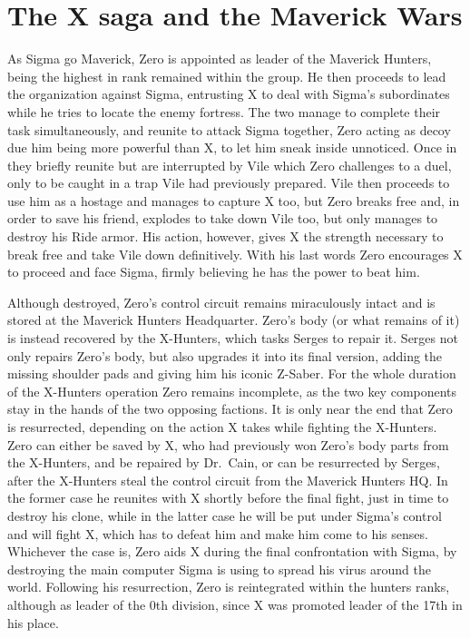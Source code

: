 \section{The X saga and the Maverick Wars}
As Sigma go Maverick, Zero is appointed as leader of the Maverick Hunters, being the highest in rank remained within the group. He then proceeds to lead the organization against Sigma, entrusting X to deal with Sigma's subordinates while he tries to locate the enemy fortress. The two manage to complete their task simultaneously, and reunite to attack Sigma together, Zero acting as decoy due him being more powerful than X, to let him sneak inside unnoticed. Once in they briefly reunite but are interrupted by Vile which Zero  challenges to a duel, only to be caught in a trap Vile had previously prepared. Vile then proceeds to use him as a hostage and manages to capture X too, but Zero breaks free and, in order to save his friend, explodes to take down Vile too, but only manages to destroy his Ride armor. His action, however, gives X the strength necessary to break free and take Vile down definitively. With his last words Zero encourages X to proceed and face Sigma, firmly believing he has the power to beat him.

Although destroyed, Zero's control circuit remains miraculously intact and is stored at the Maverick Hunters Headquarter. Zero's body (or what remains of it) is instead recovered by the X-Hunters, which tasks Serges to repair it. Serges not only repairs Zero's body, but also upgrades it into its final version, adding the missing shoulder pads and giving him his iconic Z-Saber. For the whole duration of the X-Hunters operation Zero remains incomplete, as the two key components stay in the hands of the two opposing factions. It is only near the end that Zero is resurrected, depending on the action X takes while fighting the X-Hunters. Zero can either be saved by X, who had previously won Zero's body parts from the X-Hunters, and be repaired by Dr.~Cain, or can be resurrected by Serges, after the X-Hunters steal the control circuit from the Maverick Hunters HQ. In the former case he reunites with X shortly before the final fight, just in time to destroy his clone, while in the latter case he will be put under Sigma's control and will fight X, which has to defeat him and make him come to his senses. Whichever the case is, Zero aids X during the final confrontation with Sigma, by destroying the main computer Sigma is using to spread his virus around the world. Following his resurrection, Zero is reintegrated within the hunters ranks, although as leader of the 0th division, since X was promoted leader of the 17th in his place. 

